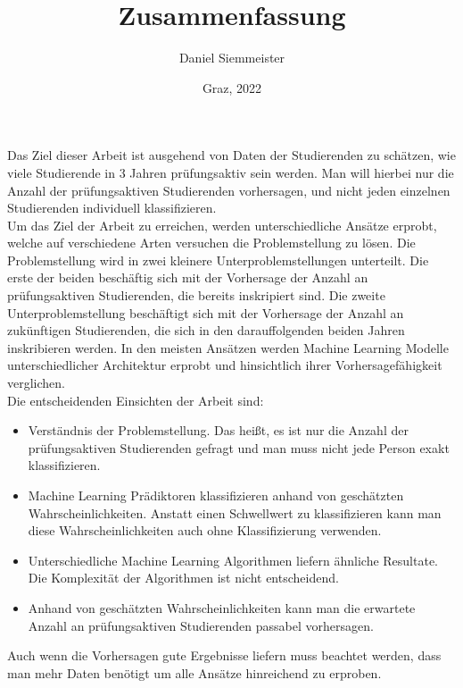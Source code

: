 \documentclass[a4paper, german, 11pt]{article}
\title{Zusammenfassung}
\author{Daniel Siemmeister}
\date{Graz, 2022}
\begin{document}
\maketitle
\thispagestyle{empty}

Das Ziel dieser Arbeit ist ausgehend von Daten der Studierenden zu sch\"atzen, wie viele
Studierende in 3 Jahren pr\"ufungsaktiv sein werden. Man will hierbei nur die Anzahl der pr\"ufungsaktiven Studierenden vorhersagen,
und nicht jeden einzelnen Studierenden individuell klassifizieren. \\

Um das Ziel der Arbeit zu erreichen, werden unterschiedliche Ans\"atze erprobt, welche auf verschiedene Arten versuchen die Problemstellung zu l\"osen.
Die Problemstellung wird in zwei kleinere Unterproblemstellungen unterteilt. Die erste der beiden besch\"aftig sich mit der Vorhersage der Anzahl an pr\"ufungsaktiven Studierenden,
die bereits inskripiert sind. Die zweite Unterproblemstellung besch\"aftigt sich mit der Vorhersage der Anzahl an zuk\"unftigen Studierenden, die sich in den darauffolgenden beiden Jahren inskribieren werden.
In den meisten Ans\"atzen werden Machine Learning Modelle unterschiedlicher Architektur erprobt und hinsichtlich ihrer Vorhersagef\"ahigkeit
verglichen. \\

Die entscheidenden Einsichten der Arbeit sind:
\begin{itemize}
    \item Verst\"andnis der Problemstellung. Das hei{\ss}t, es ist nur die Anzahl der pr\"ufungsaktiven Studierenden gefragt und man muss nicht jede Person exakt klassifizieren.
    \item Machine Learning Pr\"adiktoren klassifizieren anhand von gesch\"atzten Wahrscheinlichkeiten. Anstatt einen Schwellwert zu klassifizieren
          kann man diese Wahrscheinlichkeiten auch ohne Klassifizierung verwenden.
    \item Unterschiedliche Machine Learning Algorithmen liefern \"ahnliche Resultate. Die Komplexit\"at der Algorithmen ist nicht entscheidend.
    \item Anhand von gesch\"atzten Wahrscheinlichkeiten kann man die erwartete Anzahl an pr\"ufungsaktiven Studierenden passabel vorhersagen.
\end{itemize}

Auch wenn die Vorhersagen gute Ergebnisse liefern muss beachtet werden, dass man mehr Daten ben\"otigt um alle Ans\"atze hinreichend zu erproben.
\end{document}
